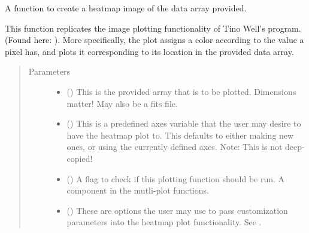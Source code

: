 \documentclass[letterpaper,10pt,english]{sphinxmanual}
\begin{document}
\begin{fulllineitems}
\label{\detokenize{python_docstrings/IfA_Smeargle.oscar.heatmaps:IfA_Smeargle.oscar.heatmaps.plot_array_heatmap_image}}
A function to create a heatmap image of the data array provided.

This function replicates the image plotting functionality of Tino Well’s
program. (Found here: ). More
specifically, the plot assigns a color according to the value a pixel
has, and plots it corresponding to its location in the provided data
array.
\begin{quote}\begin{description}
\item[{Parameters}] \leavevmode\begin{itemize}
\item {} 
 () \textendash{} This is the provided array that is to be plotted. Dimensions matter!
May also be a fits file.

\item {} 
 (\sphinxstyleliteralemphasis{\sphinxupquote{ (}}\sphinxstyleliteralemphasis{\sphinxupquote{)}}) \textendash{} This is a predefined axes variable that the user may desire to have
the heatmap plot to. This defaults to either making new ones, or
using the currently defined axes. Note: This is not deep-copied!

\item {} 
 (\sphinxstyleliteralemphasis{\sphinxupquote{ (}}\sphinxstyleliteralemphasis{\sphinxupquote{)}}) \textendash{} A flag to check if this plotting function should be run. A component
in the mutli-plot functions.

\item {} 
 () \textendash{} These are options the user may use to pass customization parameters
into the heatmap plot functionality.
See .


\end{itemize}
\end{description}
\end{quote}
\end{fulllineitems}
\end{document}
